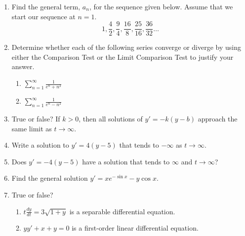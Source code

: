 \documentclass{nosvagor-notes}
\begin{document}
\begin{enumerate}
  \newpage

  \item Find the general term, \(a_n\), for the sequence given below. Assume that
  we start our sequence at \(n=1\).
  \[%
    1,\frac{4}{2}, \frac{9}{4}, \frac{16}{8}, \frac{25}{16}, \frac{36}{32}\ldots
  \]%
  \vspace{180pt}

  \item Determine whether each of the following series converge or diverge by
    using either the Comparison Test or the Limit Comparison Test to justify
    your answer.
    \begin{enumerate}
      \item \(\displaystyle\sum_{n=1}^{\infty} \frac{1}{e^n + n^2}\)
      \vspace{180pt}
      \item \(\displaystyle\sum_{n=1}^{\infty} \frac{1}{e^n - n^2}\)
    \end{enumerate}

  \newpage

  \item True or false? If \(k > 0\), then all solutions of \(y' = -k(y-b)\)
  approach the same limit as \(t \to \infty\).
  \vspace{60pt}

  \item Write a solution to \(y' = 4(y-5)\) that tends to \(-\infty\) as \(t\to
  \infty\).
  \vspace{90pt}

  \item Does \(y'=-4(y-5)\) have a solution that tends to \(\infty\) and \(t \to
  \infty\)?
  \vspace{90pt}

  \item Find the general solution \(y' = xe^{-\sin x} - y \cos x\).


  \newpage

  \item True or false?
  \begin{enumerate}
    \item \(t \frac{dy}{dt} = 3\sqrt{1+y} \) is a separable differential
      equation.
    \vspace{80pt}
    \item \(yy' + x + y = 0\) is a first-order linear differential equation.
    \vspace{80pt}
  \end{enumerate}


\end{enumerate}
\end{document}

